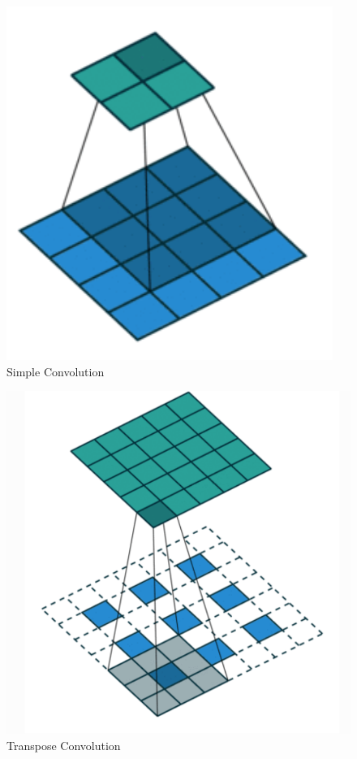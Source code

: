 \begin{figure}[H]
  \centering
    \includegraphics[scale=.4, angle=0]{Files/simple-conv.png}
    \caption[Simple Convolution]{Simple Convolution \cite{Deconv-Theano}}
    \label{fig: Simple Convolution}
\end{figure}
\begin{figure}[H]
  \centering
    \includegraphics[scale=.3, angle=0]{Files/Frational-Stride-Conv.png}
    \caption[Transpose Convolution ]{Transpose Convolution \cite{Deconv-Theano}}
    \label{fig: Strided Convolution}
\end{figure}



